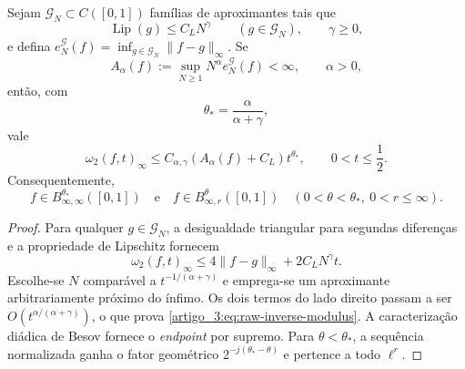 \begin{theorem}\label{map:artigo_3:5.7}
\label{artigo_3:thm:raw-lossy-inverse}
Sejam $\mathcal G_N\subset C([0,1])$ famílias de aproximantes tais que
\begin{equation}
 \operatorname{Lip}(g)\le C_LN^\gamma
 \qquad(g\in\mathcal G_N),
 \qquad \gamma\ge0,
 \label{artigo_3:eq:lipschitz-growth-family}
\end{equation}
e defina
$e_N^{\mathcal G}(f)=\inf_{g\in\mathcal G_N}\|f-g\|_\infty$. Se
\begin{equation}
 A_\alpha(f):=\sup_{N\ge1}N^\alpha e_N^{\mathcal G}(f)<\infty,
 \qquad \alpha>0,
 \label{artigo_3:eq:raw-rate-assumption}
\end{equation}
então, com
\begin{equation}
 \theta_* = \frac{\alpha}{\alpha+\gamma},
 \label{artigo_3:eq:critical-reverse-exponent}
\end{equation}
vale
\begin{equation}
 \omega_2(f,t)_\infty
 \le C_{\alpha,\gamma}(A_\alpha(f)+C_L)t^{\theta_*},
 \qquad 0<t\le\frac12.
 \label{artigo_3:eq:raw-inverse-modulus}
\end{equation}
Consequentemente,
\begin{equation}
 f\in B^{\theta_*}_{\infty,\infty}([0,1])
 \quad\text{e}\quad
 f\in B^\theta_{\infty,r}([0,1])
 \quad(0<\theta<\theta_*,\ 0<r\le\infty).
 \label{artigo_3:eq:raw-inverse-besov}
\end{equation}
\end{theorem}

\begin{proof}
Para qualquer $g\in\mathcal G_N$, a desigualdade triangular para segundas
diferenças e a propriedade de Lipschitz fornecem
\begin{equation}
 \omega_2(f,t)_\infty
 \le4\|f-g\|_\infty+2C_LN^\gamma t.
 \label{artigo_3:eq:inverse-balance}
\end{equation}
Escolhe-se $N$ comparável a $t^{-1/(\alpha+\gamma)}$ e emprega-se um aproximante
arbitrariamente próximo do ínfimo. Os dois termos do lado direito passam a
ser $O(t^{\alpha/(\alpha+\gamma)})$, o que prova
\eqref{artigo_3:eq:raw-inverse-modulus}. A caracterização diádica de Besov fornece o
\emph{endpoint} por supremo. Para $\theta<\theta_*$, a sequência normalizada ganha o
fator geométrico $2^{-j(\theta_*-\theta)}$ e pertence a todo $\ell^r$.
\end{proof}

